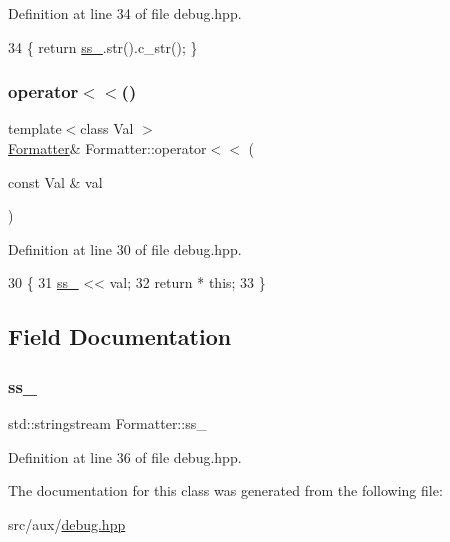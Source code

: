 Definition at line 34 of file debug.\+hpp.


\begin{DoxyCode}
34 \{ \textcolor{keywordflow}{return} \hyperlink{class_formatter_aff30cab66aec215a9a0221e11134943b}{ss\_}.str().c\_str(); \}
\end{DoxyCode}
\mbox{\label{class_formatter_a208a413dca6b2f7eb5fdb60c7a247497}} 
\subsubsection{\texorpdfstring{operator$<$$<$()}{operator<<()}}
{\footnotesize\ttfamily template$<$class Val $>$ \\
\hyperlink{class_formatter}{Formatter}\& Formatter\+::operator$<$$<$ (\begin{DoxyParamCaption}\item[{const Val \&}]{val }\end{DoxyParamCaption})\hspace{0.3cm}{\ttfamily [inline]}}



Definition at line 30 of file debug.\+hpp.


\begin{DoxyCode}
30                                                               \{
31         \hyperlink{class_formatter_aff30cab66aec215a9a0221e11134943b}{ss\_} << val;
32         \textcolor{keywordflow}{return} * \textcolor{keyword}{this};
33     \}
\end{DoxyCode}


\subsection{Field Documentation}
\mbox{\label{class_formatter_aff30cab66aec215a9a0221e11134943b}} 
\subsubsection{\texorpdfstring{ss\+\_\+}{ss\_}}
{\footnotesize\ttfamily std\+::stringstream Formatter\+::ss\+\_\+\hspace{0.3cm}{\ttfamily [private]}}



Definition at line 36 of file debug.\+hpp.



The documentation for this class was generated from the following file\+:\begin{DoxyCompactItemize}
\item 
src/aux/\hyperlink{debug_8hpp}{debug.\+hpp}\end{DoxyCompactItemize}
